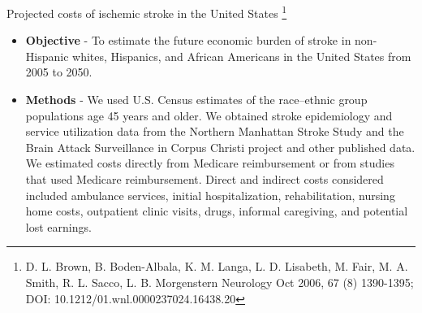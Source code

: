 \documentclass[10pt, xcolor=table]{beamer}
\begin{document}
\begin{frame}{Projected costs of ischemic stroke in the United States \footnote{D. L. Brown, B. Boden-Albala, K. M. Langa, L. D. Lisabeth, M. Fair, M. A. Smith, R. L. Sacco, L. B. Morgenstern
Neurology Oct 2006, 67 (8) 1390-1395; DOI: 10.1212/01.wnl.0000237024.16438.20}}
	\begin{itemize}
		\small
		\item \textbf{Objective} - To estimate the future economic burden of stroke in non-Hispanic whites, Hispanics, and African Americans in the United States from 2005 to 2050.
		\item \textbf{Methods} -  We used U.S. Census estimates of the race–ethnic group populations age 45 years and older. We obtained stroke epidemiology and service utilization data from the Northern Manhattan Stroke Study and the Brain Attack Surveillance in Corpus Christi project and other published data. We estimated costs directly from Medicare reimbursement or from studies that used Medicare reimbursement. Direct and indirect costs considered included ambulance services, initial hospitalization, rehabilitation, nursing home costs, outpatient clinic visits, drugs, informal caregiving, and potential lost earnings.
	\end{itemize}
	
\end{frame}
\end{document}
